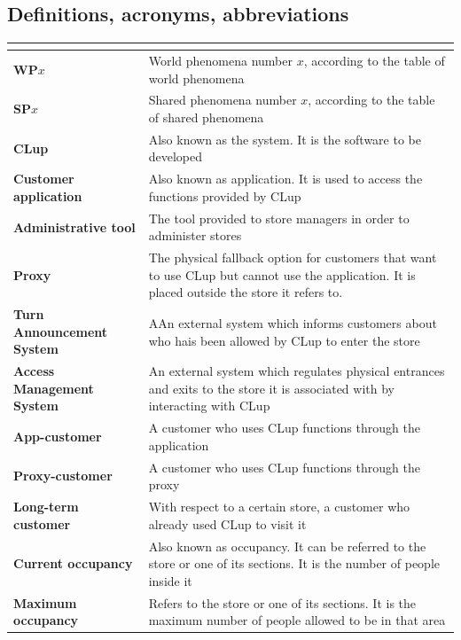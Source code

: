 \documentclass[a4paper,oneside,11pt]{book}   %
\begin{document}
    \subsection{Definitions, acronyms, abbreviations}
    \begin{longtable}[c] { |>{\bfseries{}}C{0.25\textwidth}|V{0.55\textwidth}| }
        \hline
         \\
        \hline
        WP\boldmath$x$ & World phenomena number $x$, according to the table of world phenomena \\ \hline
        SP\boldmath$x$ & Shared phenomena number $x$, according to the table of shared phenomena \\ \hline
        CLup & Also known as the system. It is the software to be developed \\ \hline
        Customer application & Also known as application. It is used to access the functions provided by CLup \\ \hline
        Administrative tool & The tool provided to store managers in order to administer stores \\ \hline
        Proxy & The physical fallback option for customers that want to use CLup but cannot use the application. It is placed outside the store it refers to. \\ \hline
        Turn Announcement System & AAn external system which informs customers about who hais been allowed by CLup to enter the store \\ \hline
        Access Management System & An external system which regulates physical entrances and exits to the store it is associated with by interacting with CLup \\ \hline
        App-customer & A customer who uses CLup functions through the application \\ \hline
        Proxy-customer & A customer who uses CLup functions through the proxy \\ \hline
        Long-term customer & With respect to a certain store, a customer who already used CLup to visit it \\ \hline
        Current occupancy & Also known as occupancy. It can be referred to the store or one of its sections. It is the number of people inside it \\ \hline
        Maximum occupancy & Refers to the store or one of its sections. It is the maximum number of people allowed to be in that area \\ \hline

\end{longtable}
\end{document}
